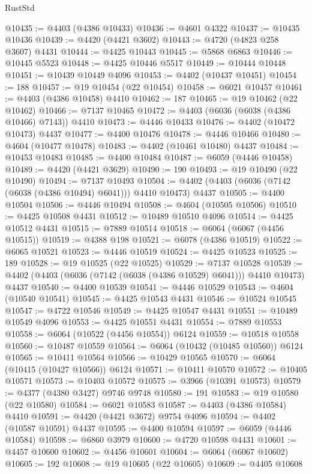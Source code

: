 \begin{lexlean}{RustStd}
\begin{coremodule}
@10435 := @4403 (@4386 @10433)
@10436 := @4601 @4322
@10437 := @10435 @10436
@10439 := @4420 (@4421 @3602)
@10443 := @4720 (@4823 @258 @3607) @4431
@10444 := @4425 @10443
@10445 := @5868 @6863
@10446 := @10445 @5523
@10448 := @4425 @10446 @5517
@10449 := @10444 @10448
@10451 := @10439 @10449 @4096
@10453 := @4402 (@10437 @10451)
@10454 := 188
@10457 := @19 @10454 (@22 @10454)
@10458 := @6021 @10457
@10461 := @4403 (@4386 @10458) @4410
@10462 := 187
@10465 := @19 @10462 (@22 @10462)
@10466 := @7137 @10465
@10472 := @4403 (@6036 (@6038 (@4386 @10466) @7143)) @4410
@10473 := @4446 @10433
@10476 := @4402 (@10472 @10473) @4437
@10477 := @4400 @10476
@10478 := @4446 @10466
@10480 := @4604 (@10477 @10478)
@10483 := @4402 (@10461 @10480) @4437
@10484 := @10453 @10483
@10485 := @4400 @10484
@10487 := @6059 (@4446 @10458)
@10489 := @4420 (@4421 @3629)
@10490 := 190
@10493 := @19 @10490 (@22 @10490)
@10494 := @7137 @10493
@10504 := @4402 (@4403 (@6036 (@7142 (@6038 (@4386 @10494) @6041))) @4410 @10473) @4437
@10505 := @4400 @10504
@10506 := @4446 @10494
@10508 := @4604 (@10505 @10506)
@10510 := @4425 @10508 @4431
@10512 := @10489 @10510 @4096
@10514 := @4425 @10512 @4431
@10515 := @7889 @10514
@10518 := @6064 (@6067 (@4456 @10515))
@10519 := @4388 @198
@10521 := @6078 (@4386 @10519)
@10522 := @6065 @10521
@10523 := @4446 @10519
@10524 := @4425 @10523
@10525 := 189
@10528 := @19 @10525 (@22 @10525)
@10529 := @7137 @10528
@10539 := @4402 (@4403 (@6036 (@7142 (@6038 (@4386 @10529) @6041))) @4410 @10473) @4437
@10540 := @4400 @10539
@10541 := @4446 @10529
@10543 := @4604 (@10540 @10541)
@10545 := @4425 @10543 @4431
@10546 := @10524 @10545
@10547 := @4722 @10546
@10549 := @4425 @10547 @4431
@10551 := @10489 @10549 @4096
@10553 := @4425 @10551 @4431
@10554 := @7889 @10553
@10558 := @6064 (@10522 (@4456 @10554)) @6124
@10559 := @10518 @10558
@10560 := @10487 @10559
@10564 := @6064 (@10432 (@10485 @10560)) @6124
@10565 := @10411 @10564
@10566 := @10429 @10565
@10570 := @6064 (@10415 (@10427 @10566)) @6124
@10571 := @10411 @10570
@10572 := @10405 @10571
@10573 := @10403 @10572
@10575 := @3966 (@10391 @10573)
@10579 := @4377 (@4380 @3427) @9746 @9748
@10580 := 191
@10583 := @19 @10580 (@22 @10580)
@10584 := @6021 @10583
@10587 := @4403 (@4386 @10584) @4410
@10591 := @4420 (@4421 @3672) @9754 @4096
@10594 := @4402 (@10587 @10591) @4437
@10595 := @4400 @10594
@10597 := @6059 (@4446 @10584)
@10598 := @6860 @3979
@10600 := @4720 @10598 @4431
@10601 := @4457 @10600
@10602 := @4456 @10601
@10604 := @6064 (@6067 @10602)
@10605 := 192
@10608 := @19 @10605 (@22 @10605)
@10609 := @4405 @10608

\end{coremodule}
\end{lexlean}

